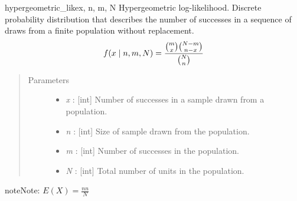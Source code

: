 \begin{funcdesc}{hypergeometric\_like}{x, n, m, N}
Hypergeometric log-likelihood. Discrete probability distribution that
describes the number of successes in a sequence of draws from a finite
population without replacement.
\begin{gather}
\begin{split}f(x \mid n, m, N) = \frac{\binom{m}{x}\binom{N-m}{n-x}}{\binom{N}{n}}\end{split}\notag
\end{gather}\begin{quote}\begin{description}
\item[Parameters] \leavevmode\begin{itemize}
\item {} 
\emph{x} : {[}int{]} Number of successes in a sample drawn from a population.

\item {} 
\emph{n} : {[}int{]} Size of sample drawn from the population.

\item {} 
\emph{m} : {[}int{]} Number of successes in the population.

\item {} 
\emph{N} : {[}int{]} Total number of units in the population.

\end{itemize}

\end{description}\end{quote}

\begin{notice}{note}{Note:}
$E(X) = \frac{n n}{N}$
\end{notice}
\end{funcdesc}

